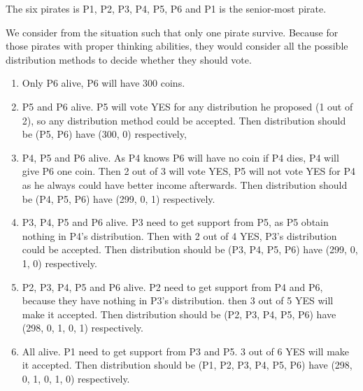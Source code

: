 \documentclass{assignment}
\begin{document}
    \begin{homeworkProblem}
    The six pirates is P1, P2, P3, P4, P5, P6 and P1 is the senior-most pirate.
    
    We consider from the situation such that only one pirate survive. Because for those pirates  with proper thinking abilities, they would consider all the possible distribution methods to decide whether they should vote. 
    \begin{enumerate}
    \item Only P6 alive, P6 will have 300 coins.
    \item P5 and P6 alive. P5 will vote YES for any distribution he proposed (1 out of 2), so any distribution method could be accepted. Then distribution should be (P5, P6) have (300, 0) respectively, 
    \item P4, P5 and P6 alive. As P4 knows P6 will have no coin if P4 dies, P4 will give P6 one coin. Then 2 out of 3 will vote YES, P5 will not vote YES for P4 as he always could have better  income afterwards. Then distribution should be (P4, P5, P6) have (299, 0, 1) respectively.
    \item P3, P4, P5 and P6 alive. P3 need to get support from P5, as P5 obtain nothing in P4's distribution. Then with 2 out of 4 YES, P3's distribution could be accepted. Then distribution should be (P3, P4, P5, P6) have (299, 0, 1, 0) respectively.
    \item P2, P3, P4, P5 and P6 alive. P2 need to get support from P4 and P6, because they have nothing in P3's distribution. then 3 out of 5 YES will make it accepted. Then distribution should be (P2, P3, P4, P5, P6) have (298, 0, 1, 0, 1) respectively.
    \item All alive. P1 need to get support from P3 and P5. 3 out of 6 YES will make it accepted. 
    Then distribution should be (P1, P2, P3, P4, P5, P6) have (298, 0, 1, 0, 1, 0) respectively.
    \end{enumerate}
    

\end{homeworkProblem}
\end{document}
